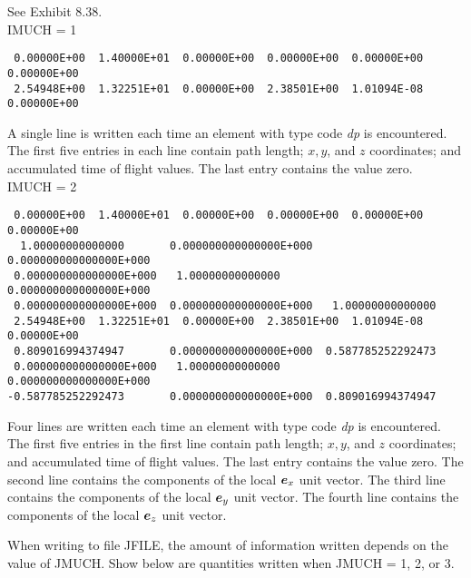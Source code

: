 \noindent See Exhibit 8.38. \\

IMUCH = 1

\begin{footnotesize}
\begin{verbatim}
 0.00000E+00  1.40000E+01  0.00000E+00  0.00000E+00  0.00000E+00  0.00000E+00
 2.54948E+00  1.32251E+01  0.00000E+00  2.38501E+00  1.01094E-08  0.00000E+00
\end{verbatim}
\end{footnotesize}

\noindent A single line is written each time an element with type code {\em dp} is
encountered.  The first five entries in each line contain path length;
$x,y$, and $z$ coordinates; and accumulated time of flight values.  The
last entry contains the value zero. \\

IMUCH = 2

\begin{footnotesize}
\begin{verbatim}
 0.00000E+00  1.40000E+01  0.00000E+00  0.00000E+00  0.00000E+00  0.00000E+00
  1.00000000000000       0.000000000000000E+000  0.000000000000000E+000
 0.000000000000000E+000   1.00000000000000       0.000000000000000E+000
 0.000000000000000E+000  0.000000000000000E+000   1.00000000000000
 2.54948E+00  1.32251E+01  0.00000E+00  2.38501E+00  1.01094E-08  0.00000E+00
 0.809016994374947       0.000000000000000E+000  0.587785252292473
 0.000000000000000E+000   1.00000000000000       0.000000000000000E+000
-0.587785252292473       0.000000000000000E+000  0.809016994374947
\end{verbatim}
\end{footnotesize}

\noindent Four lines are written each time an element with type code {\em dp} is
encountered.  The first five entries in the first line contain path
length; $x,y$, and $z$ coordinates; and accumulated time of flight
values.  The last entry contains the value zero.  The second line
contains the components of the local $\mbox{\boldmath $e$}_x$ unit vector.  The third line
contains the components of the local $\mbox{\boldmath $e$}_y$ unit vector.  The fourth line
contains the components of the local $\mbox{\boldmath $e$}_z$ unit vector.

When writing to file JFILE, the amount of information written depends on
the value of JMUCH.  Show below are quantities written when JMUCH = 1, 2,
or 3. \\

